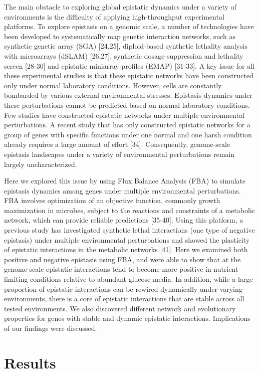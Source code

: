 The main obstacle to exploring global epistatic dynamics under a
variety of environments is the difficulty of applying high-throughput
experimental platforms. To explore epistasis on a genomic scale, a
number of technologies have been developed to systematically map
genetic interaction networks, such as synthetic genetic array (SGA)
[24,25], diploid-based synthetic lethality analysis with microarrays
(dSLAM) [26,27], synthetic dosage-suppression and lethality screen
[28-30] and epistatic miniarray profiles (EMAP) [31-33]. A key issue
for all these experimental studies is that these epistatic networks
have been constructed only under normal laboratory
conditions. However, cells are constantly bombarded by various
external environmental stresses. Epistasis dynamics under these
perturbations cannot be predicted based on normal laboratory
conditions. Few studies have constructed epistatic networks under
multiple environmental perturbations. A recent study that has only
constructed epistatic networks for a group of genes with specific
functions under one normal and one harsh condition already requires a
large amount of effort [34]. Consequently, genome-scale epistasis
landscapes under a variety of environmental perturbations remain
largely uncharacterized.

Here we explored this issue by using Flux Balance Analysis (FBA) to
simulate epistasis dynamics among genes under multiple environmental
perturbations. FBA involves optimization of an objective function,
commonly growth maximization in microbes, subject to the reactions and
constraints of a metabolic network, which can provide reliable
predictions [35-40]. Using this platform, a previous study has
investigated synthetic lethal interactions (one type of negative
epistasis) under multiple environmental perturbations and showed the
plasticity of epistatic interactions in the metabolic networks
[41]. Here we examined both positive and negative epistasis using FBA,
and were able to show that at the genome scale epistatic interactions
tend to become more positive in nutrient-limiting conditions relative
to abundant-glucose media. In addition, while a large proportion of
epistatic interactions can be rewired dynamically under varying
environments, there is a core of epistatic interactions that are
stable across all tested environments. We also discovered different
network and evolutionary properties for genes with stable and dynamic
epistatic interactions. Implications of our findings were discussed.

\section{Results}

